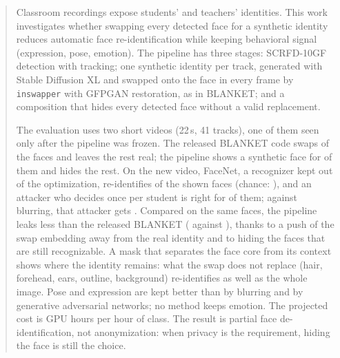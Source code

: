 \begin{abstract}

Classroom recordings expose students' and teachers' identities. This work
investigates whether swapping every detected face for a synthetic identity
reduces automatic face re-identification while keeping behavioral signal
(expression, pose, emotion). The pipeline has three stages: SCRFD-10GF detection
with tracking; one synthetic identity per track, generated with Stable Diffusion
XL and swapped onto the face in every frame by \texttt{inswapper} with GFPGAN
restoration, as in BLANKET; and a composition that hides every detected face
without a valid replacement. 

The evaluation uses two short videos (22\,s, 41
tracks), one of them seen only after the pipeline was frozen. The released
BLANKET code swaps  of the faces and
leaves the rest real; the pipeline shows a synthetic face for
 of them and hides the rest. On the
new video, FaceNet, a recognizer kept out of the optimization, re-identifies
 of the shown faces
(chance: ), and an attacker who decides once
per student is right for 
of them; against blurring, that attacker gets
. Compared on the same faces, the
pipeline leaks less than the released BLANKET
( against
), thanks to a push of
the swap embedding away from the real identity and to hiding the faces that are
still recognizable. A mask that separates the face core from its context shows
where the identity remains: what the swap does not replace (hair, forehead, ears,
outline, background) re-identifies as well as the whole image. Pose and
expression are kept better than by blurring and by generative adversarial
networks; no method keeps emotion. The projected cost is
 GPU hours per hour of class. The
result is partial face de-identification, not anonymization: when privacy is the
requirement, hiding the face is still the choice.

\end{abstract}